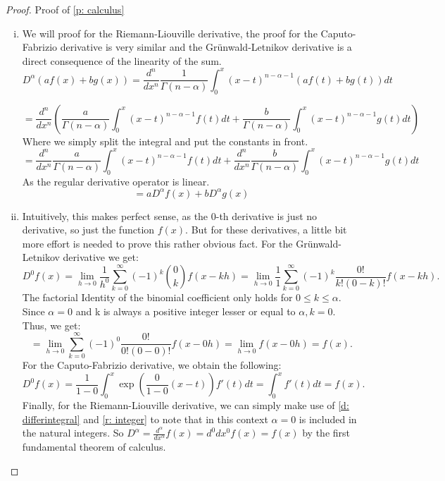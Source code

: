 \begin{proof}
    Proof of \ref{p: calculus}
    \begin{enumerate}[(i)]
        \item We will proof for the Riemann-Liouville derivative, the proof for the Caputo-Fabrizio derivative is very similar and the Grünwald-Letnikov derivative is a direct consequence of the linearity of the sum.
        \[ D^{\alpha} (a f(x) + b g(x)) = \frac{d^n}{dx^n}\frac{1}{\Gamma(n - \alpha)} \int_{0}^{x} (x - t)^{n - \alpha - 1} (a f(t) + b g(t)) dt \]
     
        \[= \frac{d^n}{dx^n}\left(\frac{a}{\Gamma(n - \alpha)} \int_{0}^{x} (x - t)^{n - \alpha - 1}  f(t)dt + \frac{b}{\Gamma(n - \alpha)} \int_{0}^{x} (x - t)^{n - \alpha - 1} g(t)dt\right) \] Where we simply split the integral and put the constants in front.
        \[= \frac{d^n}{dx^n}\frac{a}{\Gamma(n - \alpha)} \int_{0}^{x} (x - t)^{n - \alpha - 1}  f(t)dt + \frac{d^n}{dx^n} \frac{b}{\Gamma(n - \alpha)} \int_{0}^{x} (x - t)^{n - \alpha - 1} g(t)dt \] As the regular derivative operator is linear.
        \[ = a D^{\alpha} f(x) + b D^{\alpha} g(x) \]
        \item Intuitively, this makes perfect sense, as the 0-th derivative is just no derivative, so just the function \(f(x)\). But for these derivatives, a little bit more effort is needed to prove this rather obvious fact.
        \newline 
        For the Grünwald-Letnikov derivative we get: \[D^0 f(x) = \lim_{h \to 0} \frac{1}{h^0} \sum_{k=0}^\infty (-1)^k \binom{0}{k} f(x - k h)
        = \lim_{h \to 0} \frac{1}{1} \sum_{k=0}^\infty (-1)^k \frac{0!}{k!(0- k)!} f(x - k h).\] The factorial Identity of the binomial coefficient only holds for \(0 \leq k \leq \alpha\). Since \(\alpha = 0\) and k is always a positive integer lesser or equal to \(\alpha, k = 0\). Thus, we get:
        \[ = \lim_{h \to 0} \sum_{k=0}^\infty (-1)^0 \frac{0!}{0!(0- 0)!} f(x - 0 h) = \lim_{h \to 0} f(x - 0 h) = f(x).\]
        \newline
        For the Caputo-Fabrizio derivative, we obtain the following:
        \[ D^{0} f(x) = \frac{1}{1 - 0}  \int_{0}^{x} \exp\left(\frac{0}{1 -0}(x-t)\right) f'(t) dt = \int_{0}^{x}f'(t) dt = f(x).\]
        \newline
        Finally, for the Riemann-Liouville derivative, we can simply make use of \autoref{d: differintegral} and \autoref{r: integer} to note that in this context \(\alpha = 0\) is included in the natural integers. So \(D^\alpha = \frac{d^\alpha}{dx^\alpha} f(x) = {d^0}{dx^0} f(x) = f(x)\) by the first fundamental theorem of calculus.


\end{enumerate}
\end{proof}
